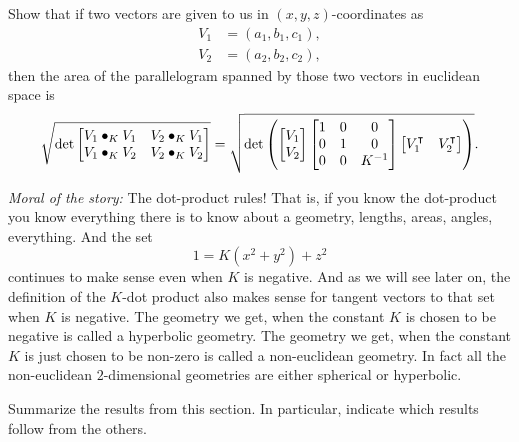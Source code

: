 \documentclass{ximera}
\begin{document}
\begin{problem}
  
Show that if two vectors are given to us in $(x,y,z)$-coordinates as%
\begin{align*}
V_{1}  &  =\left(  a_{1},b_{1},c_{1}\right), \\
V_{2}  &  =\left(  a_{2},b_{2},c_{2}\right),
\end{align*}
then the area of the parallelogram spanned by those two vectors in euclidean
space is%
\[
\sqrt{\det
\begin{bmatrix}
V_{1}\bullet_{K}V_{1} & V_{2}\bullet_{K}V_{1}\\
V_{1}\bullet_{K}V_{2} & V_{2}\bullet_{K}V_{2}%
\end{bmatrix}}
=\sqrt{\det\left( 
\begin{bmatrix}
V_{1} \\
V_{2}
\end{bmatrix}
\begin{bmatrix}
1 & 0 & 0\\
0 & 1 & 0\\
0 & 0 & K^{-1}%
\end{bmatrix}
\begin{bmatrix}
V_{1}^\transpose & V_{2}^\transpose%
\end{bmatrix}
\right) }.
\]
\end{problem}

\textit{Moral of the story:} The dot-product rules! That is, if you
know the dot-product you know everything there is to know about a
geometry, lengths, areas, angles, everything. And the set
\[
1=K(x^2+y^2)+z^2
\]
continues to make sense even when $K$ is
negative. And as we will see later on, the definition of the $K$-dot
product also makes sense for tangent vectors to that set when $K$ is
negative. The geometry we get, when the constant $K$ is chosen to be
negative is called a hyperbolic geometry. The geometry we get, when
the constant $K$ is just chosen to be non-zero is called a
non-euclidean geometry.  In fact all the non-euclidean $2$-dimensional
geometries are either spherical or hyperbolic.



\begin{problem}
Summarize the results from this section. In particular, indicate which
results follow from the others.
\begin{freeResponse}
\end{freeResponse}
\end{problem}
\end{document}
